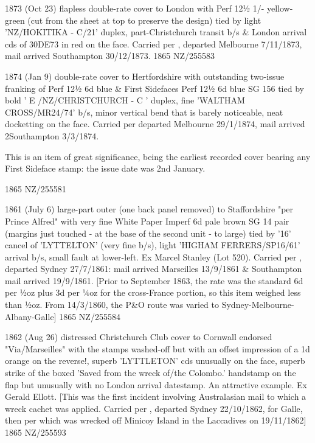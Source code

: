 \documentclass[justified]{tufte-book}
\begin{document}
%
{ 1873 (Oct 23) flapless double-rate cover to London with Perf 12½ 1/- yellow-green (cut from the sheet at top to preserve the design) tied by light 'NZ/HOKITIKA - C/21' duplex, part-Christchurch transit b/s \& London arrival cds of 30DE73 in red on the face. Carried per , departed Melbourne 7/11/1873, mail arrived Southampton 30/12/1873.}%
{1865}%
{NZ/255583}%
{}%
{}
{}%
{}%

%
{1874 (Jan 9) double-rate cover to Hertfordshire with outstanding two-issue franking of Perf 12½ 6d blue \& First Sidefaces Perf 12½ 6d blue SG 156 tied by bold ' E /NZ/CHRISTCHURCH - C ' duplex, fine 'WALTHAM CROSS/MR24/74' b/s, minor vertical bend that is barely noticeable, neat docketting on the face. Carried per  departed Melbourne 29/1/1874, mail arrived 2Southampton 3/3/1874. 

This is an item of great significance, being the earliest recorded cover bearing any First Sideface stamp: the issue date was 2nd January.}%
{1865}%
{NZ/255581}%
{}%
{}
{}%
{}%

%
{1861 (July 6) large-part outer (one back panel removed) to Staffordshire "per Prince Alfred" with very fine White Paper Imperf 6d pale brown SG 14 pair (margins just touched - at the base of the second unit - to large) tied by '16' cancel of 'LYTTELTON' (very fine b/s), light 'HIGHAM FERRERS/SP16/61' arrival b/s, small fault at lower-left. Ex Marcel Stanley (Lot 520). Carried per , departed Sydney 27/7/1861: mail arrived Marseilles 13/9/1861 \& Southampton mail arrived 19/9/1861. [Prior to September 1863, the rate was the standard 6d per ½oz plus 3d per ¼oz for the cross-France portion, so this item weighed less than ½oz. From 14/3/1860, the P\&O route was varied to Sydney-Melbourne-Albany-Galle]}%
{1865}%
{NZ/255584}%
{}%
{}
{}%
{}%

%
{1862 (Aug 26) distressed Christchurch Club cover to Cornwall endorsed "Via/Marseilles" with the stamps washed-off but with an offset impression of a 1d orange on the reverse!, superb 'LYTTLETON' cds unusually on the face, superb strike of the boxed 'Saved from the wreck of/the Colombo.' handstamp on the flap but unusually with no London arrival datestamp. An attractive example. Ex Gerald Ellott. [This was the first incident involving Australasian mail to which a wreck cachet was applied. Carried per , departed Sydney 22/10/1862, for Galle, then per  which was wrecked off Minicoy Island in the Laccadives on 19/11/1862]}%
{1865}%
{NZ/255593}%
{}%
{}
{}%
{}%
\end{document}
